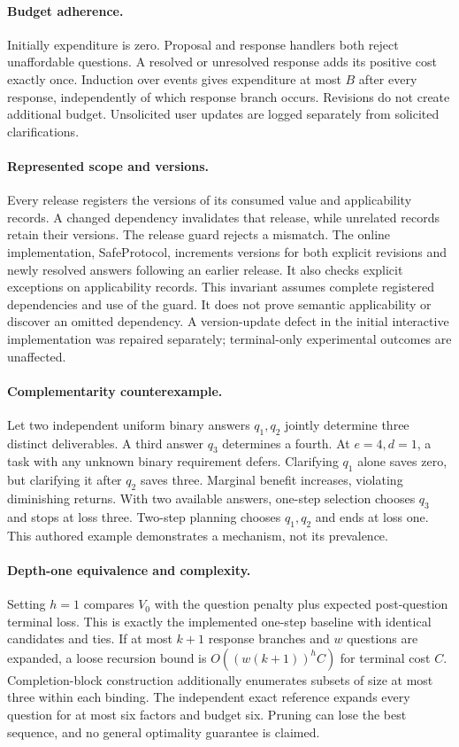 \documentclass[11pt]{article}
\begin{document}
\paragraph{Budget adherence.} Initially expenditure is zero. Proposal and response handlers both reject unaffordable questions. A resolved or unresolved response adds its positive cost exactly once. Induction over events gives expenditure at most $B$ after every response, independently of which response branch occurs. Revisions do not create additional budget. Unsolicited user updates are logged separately from solicited clarifications.

\paragraph{Represented scope and versions.} Every release registers the versions of its consumed value and applicability records. A changed dependency invalidates that release, while unrelated records retain their versions. The release guard rejects a mismatch. The online implementation, SafeProtocol, increments versions for both explicit revisions and newly resolved answers following an earlier release. It also checks explicit exceptions on applicability records. This invariant assumes complete registered dependencies and use of the guard. It does not prove semantic applicability or discover an omitted dependency. A version-update defect in the initial interactive implementation was repaired separately; terminal-only experimental outcomes are unaffected.

\paragraph{Complementarity counterexample.} Let two independent uniform binary answers $q_1,q_2$ jointly determine three distinct deliverables. A third answer $q_3$ determines a fourth. At $e=4,d=1$, a task with any unknown binary requirement defers. Clarifying $q_1$ alone saves zero, but clarifying it after $q_2$ saves three. Marginal benefit increases, violating diminishing returns. With two available answers, one-step selection chooses $q_3$ and stops at loss three. Two-step planning chooses $q_1,q_2$ and ends at loss one. This authored example demonstrates a mechanism, not its prevalence.

\paragraph{Depth-one equivalence and complexity.} Setting $h=1$ compares $V_0$ with the question penalty plus expected post-question terminal loss. This is exactly the implemented one-step baseline with identical candidates and ties. If at most $k+1$ response branches and $w$ questions are expanded, a loose recursion bound is $O((w(k+1))^h C)$ for terminal cost $C$. Completion-block construction additionally enumerates subsets of size at most three within each binding. The independent exact reference expands every question for at most six factors and budget six. Pruning can lose the best sequence, and no general optimality guarantee is claimed.
\end{document}

